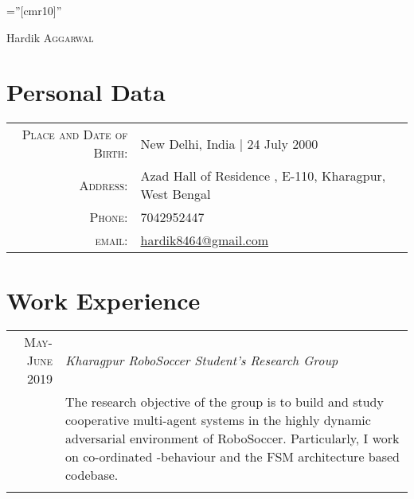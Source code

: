 \documentclass[a4paper,10pt]{article}
\begin{document}

\pagestyle{empty} %

\font\fb=''[cmr10]'' %

\par{\centering
		{\Huge Hardik \textsc{Aggarwal}
	}\bigskip\par}

\section{Personal Data}

\begin{tabular}{rl}
    \textsc{Place and Date of Birth:} & New Delhi, India  | 24 July 2000 \\
    \textsc{Address:}   & Azad Hall of Residence , E-110, Kharagpur, West Bengal \\
    \textsc{Phone:}     & 7042952447\\
    \textsc{email:}     & \href{mailto:hardik8464@gmail.com}{hardik8464@gmail.com}
\end{tabular}

\section{Work Experience}
\begin{tabular}{r|p{11cm}}
 \textsc{May-June 2019}&\emph{Kharagpur RoboSoccer Student's Research Group}\\&\footnotesize{The research objective of the group is to build and study cooperative multi-agent systems in the highly dynamic adversarial environment of RoboSoccer. Particularly, I work on co-ordinated -behaviour and the FSM architecture based codebase.}\\\multicolumn{2}{c}{} \\
 
\end{tabular}
\end{document}
